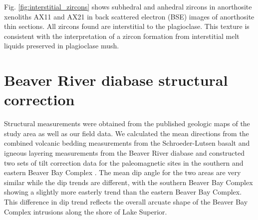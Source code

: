 Fig. \ref{fig:interstitial_zircons} shows subhedral and anhedral zircons in anorthosite xenoliths AX11 and AX21 in back scattered electron (BSE) images of anorthosite thin sections. All zircons found are interstitial to the plagioclase. This texture is consistent with the interpretation of a zircon formation from interstitial melt liquids preserved in plagioclase mush.

\section*{Beaver River diabase structural correction}

Structural measurements were obtained from the published geologic maps of the study area as well as our field data. We calculated the mean directions from the combined volcanic bedding measurements from the Schroeder-Lutsen basalt and igneous layering measurements from the Beaver River diabase and constructed two sets of tilt correction data for the paleomagnetic sites in the southern and eastern Beaver Bay Complex \citep{Boerboom2004a, Boerboom2006a, Boerboom2006b, Boerboom2007a, Miller2001a}. The mean dip angle for the two areas are very similar while the dip trends are different, with the southern Beaver Bay Complex showing a slightly more easterly trend than the eastern Beaver Bay Complex. This difference in dip trend reflects the overall arcuate shape of the Beaver Bay Complex intrusions along the shore of Lake Superior. 

